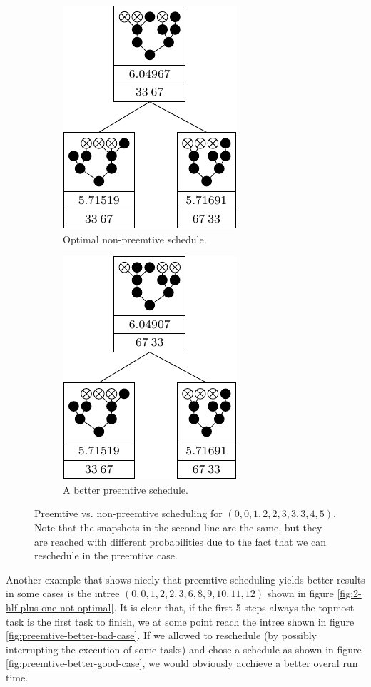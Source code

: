\begin{figure}[ht]
  \centering
  \begin{subfigure}{.45\linewidth}
    \centering
    \includegraphics{p3/preemtive/0012233345_nonpreemtive.pdf}
    \caption{Optimal non-preemtive schedule.}
  \end{subfigure}
  \quad
  \begin{subfigure}{.45\linewidth}
    \centering
    \includegraphics{p3/preemtive/0012233345_preemtive.pdf}
    \caption{A better preemtive schedule.}
  \end{subfigure}
  \caption{Preemtive vs. non-preemtive scheduling for $(0,0,1,2,2,3,3,3,4,5)$. Note that the snapshots in the second line are the same, but they are reached with different probabilities due to the fact that we can reschedule in the preemtive case.}
  \label{fig:preemtive-example-00111222}
\end{figure}

Another example that shows nicely that preemtive scheduling yields better results in some cases is the intree $(0,0,1,2,2,3,6,8,9,10,11,12)$ shown in figure \ref{fig:2-hlf-plus-one-not-optimal}. It is clear that, if the first 5 steps always the topmost task is the first task to finish, we at some point reach the intree shown in figure \ref{fig:preemtive-better-bad-case}. If we allowed to reschedule (by possibly interrupting the execution of some tasks) and chose a schedule as shown in figure \ref{fig:preemtive-better-good-case}, we would obviously acchieve a better overal run time. 

